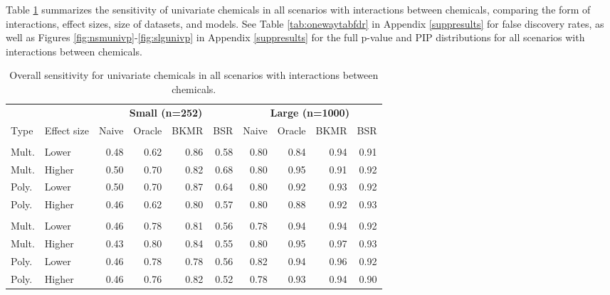 \documentclass[12pt, twoside]{amherstthesis}
\begin{document}
Table \ref{tab:onewaytabsens} summarizes the sensitivity of univariate chemicals in all scenarios with interactions between chemicals, comparing the form of interactions, effect sizes, size of datasets, and models. See Table \ref{tab:onewaytabfdr} in Appendix \ref{suppresults} for false discovery rates, as well as Figures \ref{fig:nsmunivp}-\ref{fig:slgunivp} in Appendix \ref{suppresults} for the full p-value and PIP distributions for all scenarios with interactions between chemicals.
\begin{table}

\caption{\label{tab:onewaytabsens}Overall sensitivity for univariate chemicals in all scenarios with interactions between chemicals.}
\centering
\begin{tabular}[t]{llrrrrrrrr}
\toprule
\multicolumn{2}{c}{\textbf{ }} & \multicolumn{4}{c}{\textbf{Small (n=252)}} & \multicolumn{4}{c}{\textbf{Large (n=1000)}} \\
\cmidrule(l{3pt}r{3pt}){3-6} \cmidrule(l{3pt}r{3pt}){7-10}
Type & Effect size & Naive & Oracle & BKMR & BSR & Naive & Oracle & BKMR & BSR\\
\midrule
\addlinespace[0.3em]
\multicolumn{10}{l}{\textbf{Hg-Ni}}\\
\hspace{1em}Mult. & Lower & 0.48 & 0.62 & 0.86 & 0.58 & 0.80 & 0.84 & 0.94 & 0.91\\
\hspace{1em}Mult. & Higher & 0.50 & 0.70 & 0.82 & 0.68 & 0.80 & 0.95 & 0.91 & 0.92\\
\hspace{1em}Poly. & Lower & 0.50 & 0.70 & 0.87 & 0.64 & 0.80 & 0.92 & 0.93 & 0.92\\
\hspace{1em}Poly. & Higher & 0.46 & 0.62 & 0.80 & 0.57 & 0.80 & 0.88 & 0.92 & 0.93\\
\addlinespace[0.3em]
\multicolumn{10}{l}{\textbf{Cd-As}}\\
\hspace{1em}Mult. & Lower & 0.46 & 0.78 & 0.81 & 0.56 & 0.78 & 0.94 & 0.94 & 0.92\\
\hspace{1em}Mult. & Higher & 0.43 & 0.80 & 0.84 & 0.55 & 0.80 & 0.95 & 0.97 & 0.93\\
\hspace{1em}Poly. & Lower & 0.46 & 0.78 & 0.78 & 0.56 & 0.82 & 0.94 & 0.96 & 0.92\\
\hspace{1em}Poly. & Higher & 0.46 & 0.76 & 0.82 & 0.52 & 0.78 & 0.93 & 0.94 & 0.90\\

\end{tabular}
\end{table}
\end{document}
